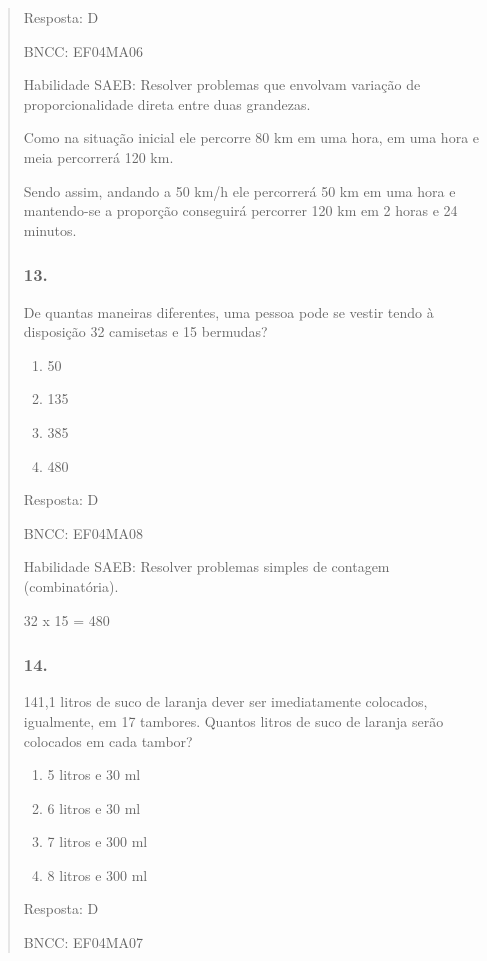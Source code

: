 \begin{enumerate}
\begin{escolha}
\begin{enumerate}
\begin{itemize}
\begin{itemize}
\begin{escolha}
\begin{quote}
\begin{escolha}
{Resposta: D

BNCC: EF04MA06

Habilidade SAEB: Resolver problemas que envolvam variação de
proporcionalidade direta entre duas grandezas.

Como na situação inicial ele percorre 80 km em uma hora, em uma hora e
meia percorrerá 120 km.

Sendo assim, andando a 50 km/h ele percorrerá 50 km em uma hora e
mantendo-se a proporção conseguirá percorrer 120 km em 2 horas e 24
minutos.

\subsubsection{13. }\label{section-154}

De quantas maneiras diferentes, uma pessoa pode se vestir tendo à
disposição 32 camisetas e 15 bermudas?

\begin{enumerate}
\def\labelenumi{\alph{enumi})}
\item
  50
\item
  135
\item
  385
\item
  480
\end{enumerate}

Resposta: D

BNCC: EF04MA08

Habilidade SAEB: Resolver problemas simples de contagem (combinatória).

32 x 15 = 480

\subsubsection{14.}\label{section-155}

141,1 litros de suco de laranja dever ser imediatamente colocados,
igualmente, em 17 tambores. Quantos litros de suco de laranja serão
colocados em cada tambor?

\begin{enumerate}
\def\labelenumi{\alph{enumi})}
\item
  5 litros e 30 ml
\item
  6 litros e 30 ml
\item
  7 litros e 300 ml
\item
  8 litros e 300 ml
\end{enumerate}

Resposta: D

BNCC: EF04MA07

}
\end{escolha}
\end{quote}
\end{escolha}
\end{itemize}
\end{itemize}
\end{enumerate}
\end{escolha}
\end{enumerate}

